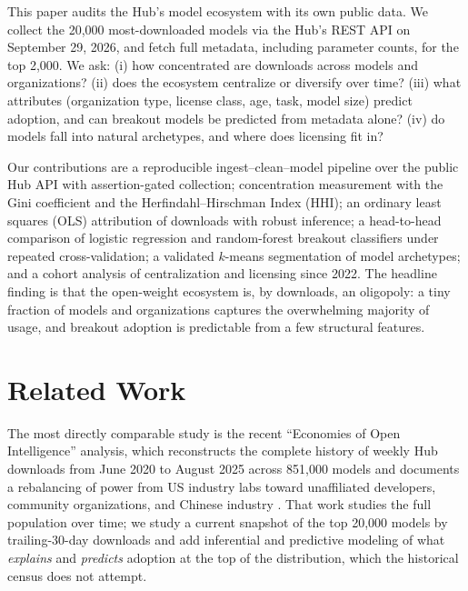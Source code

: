 \documentclass[conference]{IEEEtran}
\begin{document}
This paper audits the Hub's model ecosystem with its own public data. We
collect the 20,000 most-downloaded models via the Hub's REST API on September
29, 2026, and fetch full metadata, including parameter counts, for the top
2,000. We ask: (i) how concentrated are downloads across models and
organizations? (ii) does the ecosystem centralize or diversify over time?
(iii) what attributes (organization type, license class, age, task, model
size) predict adoption, and can breakout models be predicted from metadata
alone? (iv) do models fall into natural archetypes, and where does licensing
fit in?

Our contributions are a reproducible ingest--clean--model pipeline over the
public Hub API with assertion-gated collection; concentration measurement
with the Gini coefficient and the Herfindahl--Hirschman Index (HHI); an
ordinary least squares (OLS) attribution of downloads with robust inference;
a head-to-head comparison of logistic regression and random-forest breakout
classifiers under repeated cross-validation; a validated $k$-means
segmentation of model archetypes; and a cohort analysis of centralization and
licensing since 2022. The headline finding is that the open-weight ecosystem
is, by downloads, an oligopoly: a tiny fraction of models and organizations
captures the overwhelming majority of usage, and breakout adoption is
predictable from a few structural features.

\section{Related Work}
The most directly comparable study is the recent ``Economies of Open
Intelligence'' analysis, which reconstructs the complete history of weekly
Hub downloads from June 2020 to August 2025 across 851,000 models and
documents a rebalancing of power from US industry labs toward unaffiliated
developers, community organizations, and Chinese industry \cite{econ-open-intel}.
That work studies the full population over time; we study a current snapshot
of the top 20,000 models by trailing-30-day downloads and add inferential and
predictive modeling of what \emph{explains} and \emph{predicts} adoption at the
top of the distribution, which the historical census does not attempt.
\end{document}
